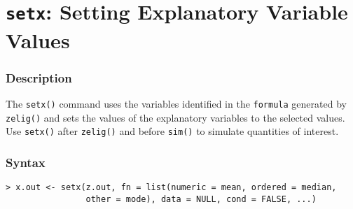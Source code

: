 \section{{\tt setx}: Setting Explanatory Variable Values}\label{ss:setx}

\subsubsection{Description}
The \texttt{setx()} command uses the variables identified in the
\texttt{formula} generated by \texttt{zelig()} and sets the values of
the explanatory variables to the selected values.  Use \texttt{setx()}
after {\tt zelig()} and before \texttt{sim()} to simulate quantities
of interest.

\subsubsection{Syntax}
\begin{verbatim}
> x.out <- setx(z.out, fn = list(numeric = mean, ordered = median, 
                other = mode), data = NULL, cond = FALSE, ...)
\end{verbatim}

